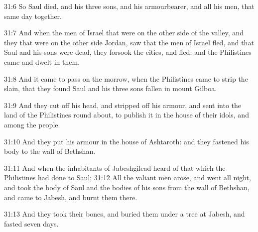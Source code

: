 31:6 So Saul died, and his three sons, and his armourbearer, and all
his men, that same day together.

31:7 And when the men of Israel that were on the other side of the
valley, and they that were on the other side Jordan, saw that the men
of Israel fled, and that Saul and his sons were dead, they forsook the
cities, and fled; and the Philistines came and dwelt in them.

31:8 And it came to pass on the morrow, when the Philistines came to
strip the slain, that they found Saul and his three sons fallen in
mount Gilboa.

31:9 And they cut off his head, and stripped off his armour, and sent
into the land of the Philistines round about, to publish it in the
house of their idols, and among the people.

31:10 And they put his armour in the house of Ashtaroth: and they
fastened his body to the wall of Bethshan.

31:11 And when the inhabitants of Jabeshgilead heard of that which the
Philistines had done to Saul; 31:12 All the valiant men arose, and
went all night, and took the body of Saul and the bodies of his sons
from the wall of Bethshan, and came to Jabesh, and burnt them there.

31:13 And they took their bones, and buried them under a tree at
Jabesh, and fasted seven days.

